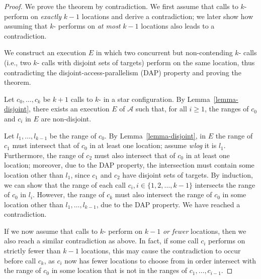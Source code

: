\begin{proof}
We prove the theorem by contradiction. We first assume that calls to $k$-\cas{} perform \cas{} on \textit{exactly} $k-1$ locations and derive a contradiction; we later show how assuming that $k$-\cas{} performs \cas{} on \textit{at most} $k-1$ locations also leads to a contradiction.

We construct an execution $E$ in which two concurrent but non-contending $k$-\cas{} calls (i.e., two $k$-\cas{} calls with disjoint sets of targets) perform \cas{} on the same location, thus contradicting the disjoint-access-parallelism (DAP) property and proving the theorem.

Let $c_0,\dots,c_k$ be $k+1$ calls to $k$-\cas{} in a star configuration. By Lemma~\ref{lemma-disjoint}, there exists an execution $E$ of $\mathcal{A}$ such that, for all $i \geq 1$, the ranges of $c_0$ and $c_i$ in $E$ are non-disjoint.

Let $l_1, \dots, l_{k-1}$ be the range of $c_0$. By Lemma~\ref{lemma-disjoint}, in $E$ the range of $c_1$ must intersect that of $c_0$ in at least one location; assume \textit{wlog} it is $l_1$. Furthermore, the range of $c_2$ must also intersect that of $c_0$ in at least one location; moreover, due to the DAP property, the intersection must contain some location other than $l_1$, since $c_1$ and $c_2$ have disjoint sets of targets. By induction, we can show that the range of each call $c_i, i\in\lbrace 1,2,\dots,k-1\rbrace$ intersects the range of $c_0$ in $l_i$. However, the range of $c_k$ must also intersect the range of $c_0$ in some location other than $l_1, \dots, l_{k-1}$, due to the DAP property. We have reached a contradiction.

If we now assume that calls to $k$-\cas{} perform \cas{} on $k-1$ \textit{or fewer} locations, then we also reach a similar contradiction as above. In fact, if some call $c_i$ performs \cas{} on strictly fewer than $k-1$ locations, this may cause the contradiction to occur before call $c_k$, as $c_i$ now has fewer locations to choose from in order intersect with the range of $c_0$ in some location that is not in the ranges of $c_1,\dots, c_{i-1}$.
\end{proof}